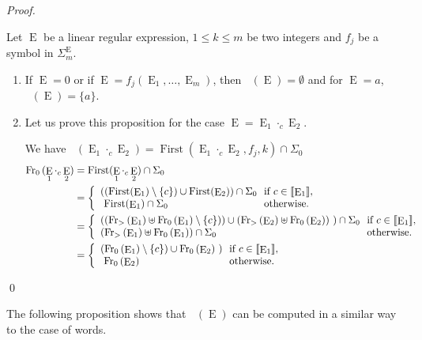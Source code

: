 \documentclass{llncs}
\DeclareMathOperator{\First}{First}
\DeclareMathOperator{\E}{E}
\DeclareMathOperator{\Fir}{Fr_>}
\DeclareMathOperator{\Firs}{Fr_0}
\def\firstt#1{\Fir{(#1)}}
\def\firs#1{\Firs{(#1)}}
\begin{document}
\begin{proof}
\begin{sloppy}  
  
Let $\E$ be a linear regular expression, $1\leq k\leq m$ be two integers and $f_j$ be a symbol in $\Sigma^{\E}_m$.
\begin{enumerate}
\item If $\E=0$ or if $\E=f_j(\E_1,\ldots,\E_m)$, then $\firs{\E}=\emptyset$ and for $\E=a$, $\firs{\E}=\{a\}$.  

\item Let us prove this proposition for the case $\E=\E_1\cdot_c \E_2$. 

We have $\firs{\E_1\cdot_c \E_2}=\First(\E_1\cdot_c \E_2,f_j,k)\cap{\Sigma}_0$
 \begin{align*} 
\firs{\E_1\cdot_c \E_2}&=\First(\E_1\cdot_c \E_2)\cap{\Sigma}_0\\ 
&=\left\{
          \begin{array}{l@{\ }l}
            ((\First(\E_1)\setminus\{c\})\cup \First(\E_2))\cap{\Sigma}_0 & \mbox{ if } c \in\llbracket{\E_1}\rrbracket,\\
             \ \First(\E_1)\cap{\Sigma}_0 & \text{ otherwise.}\\ 
          \end{array}
        \right.\\
&=\left\{
    \begin{array}{l@{\ }l}
((\firstt{\E_1}\uplus \firs{\E_1}\setminus\{c\}))\cup (\firstt{\E_2}\uplus\firs{\E_2})~)\cap{\Sigma}_0 & \mbox{ if } c \in\llbracket{\E_1}\rrbracket,\\
     (\firstt{\E_1}\uplus \firs{\E_1})\cap{\Sigma}_0 & \text{ otherwise.}\\ 
          \end{array}
        \right.\\
&=\left\{
    \begin{array}{l@{\ }l}
(\firs{\E_1}\setminus\{c\})\cup \firs{\E_2}~) & \mbox{ if } c \in\llbracket{\E_1}\rrbracket,\\
    \ \firs{\E_2} & \text{ otherwise.}\\ 
          \end{array}
        \right.\\
\end{align*}
\end{enumerate}
\end{sloppy}  
  \qed
\end{proof} 
The following proposition shows that $\firstt{\E}$ can be computed in a similar way to the case of words. 
\end{document}
